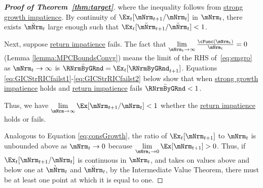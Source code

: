 \documentclass[\econtexRoot/BufferStockTheory]{subfiles}
\begin{document}
\begin{proof}[\textbf{Proof of Theorem~\ref{thm:target}}]
where the inequality follows from \hyperlink{GICMod}{strong growth impatience}.
By continuity of  $\Ex_{t}[{\mNrm}_{t+1}/\mNrm_t]$ in $\mNrm_t$, there exists $\breve{\mNrm}_{t}$ large enough such that $\Ex_t [\breve{\mNrm}_{t+1}/\breve{\mNrm}_t] < 1$.



Next, suppose \hyperlink{RIC}{return impatience} fails.
The fact that $\lim\limits_{\mNrm_{t} \rightarrow \infty} \frac{\cFunc(\mNrm_{t})}{\mNrm_{t}} = 0$ (Lemma \ref{lemma:MPCBoundsConvg}) means the limit of the RHS of~\eqref{eq:emgro} as $\mNrm_{t} \rightarrow \infty$ is $\bar{\RNrmByGRnd}=\Ex_{t}[\RNrmByGRnd_{t+1}]$.
Equations \eqref{eq:GICStrRICfailst1}-\eqref{eq:GICStrRICfailst2} below show that when \hyperlink{GICMod}{strong growth impatience} holds and \hyperlink{RIC}{return impatience} fails $\bar{\RNrmByGRnd} < 1$.

Thus, we have $\lim\limits_{\mNrm \rightarrow \infty} \Ex[\mNrm_{t+1}/\mNrm_{t}] < 1$ whether the \hyperlink{RIC}{return impatience} holds or fails.

\medskip


Analogous to Equation \eqref{eq:consGrowth},  the ratio of $\Ex_{t}[\mNrm_{t+1}]$ to $\mNrm_{t}$ is unbounded above as $\mNrm_{t} \rightarrow 0$ because $\lim\limits_{\mNrm_{t}\rightarrow 0} \Ex[\mNrm_{t+1}] > 0$.
Thus, if $\Ex_t [{\mNrm}_{t+1}/\mNrm_t]$ is continuous in $\mNrm_t$, and takes on values above and below one at $\grave{\mNrm}_{t}$ and $\breve{\mNrm}_{t}$, by the Intermediate Value Theorem, there must be at least one point at which it is equal to one.



\end{proof}
\end{document}
